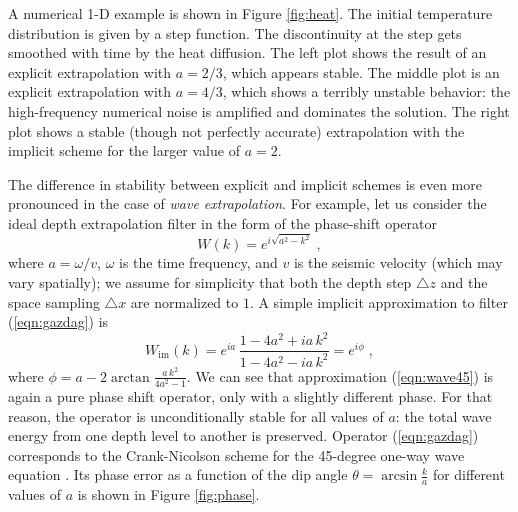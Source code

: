 
\par
A numerical 1-D example is shown in Figure \ref{fig:heat}. The initial
temperature distribution is given by a step function. The
discontinuity at the step gets smoothed with time by the heat
diffusion. The left plot shows the result of an explicit extrapolation
with $a=2/3$, which appears stable. The middle plot is an explicit
extrapolation with $a=4/3$, which shows a terribly unstable behavior:
the high-frequency numerical noise is amplified and dominates the
solution. The right plot shows a stable (though not perfectly
accurate) extrapolation with the implicit scheme for the larger value of
$a=2$.
\par
The difference in stability between explicit and implicit schemes is
even more pronounced in the case of \emph{wave extrapolation}. For
example, let us consider the ideal depth extrapolation filter in the
form of the phase-shift operator
\cite[]{GEO43-07-13421351,Claerbout.blackwell.85}
\begin{equation}
  \label{eqn:gazdag}
  W (k) = e^{i \sqrt{a^2 - k^2}}\;,
\end{equation}
where $a = \omega / v$, $\omega$ is the time frequency, and $v$ is the
seismic velocity (which may vary spatially); we assume for simplicity
that both the depth step $\triangle z$ and the space sampling
$\triangle x$ are normalized to $1$.  A simple implicit approximation
to filter (\ref{eqn:gazdag}) is
\begin{equation}
  \label{eqn:wave45}
   W_{\mbox{im}} (k) = e^{i a}\,
   \frac{1 -4 a^2 + i a\,k^2}{1 - 4 a^2 - i a\,k^2} = e^{i \phi}\;,
\end{equation}
where $\phi = a - 2 \arctan{\frac{a\,k^2}{4 a^2-1}}$. We can see
that approximation (\ref{eqn:wave45}) is again a pure phase shift
operator, only with a slightly different phase. For that reason, the
operator is unconditionally stable for all values of $a$: the total
wave energy from one depth level to another is preserved. Operator
(\ref{eqn:gazdag}) corresponds to the Crank-Nicolson scheme for the
45-degree one-way wave equation \cite[]{Claerbout.blackwell.85}. Its
phase error as a function of the dip angle $\theta =
\arcsin{\frac{k}{a}}$ for different values of $a$ is shown in Figure
\ref{fig:phase}.

